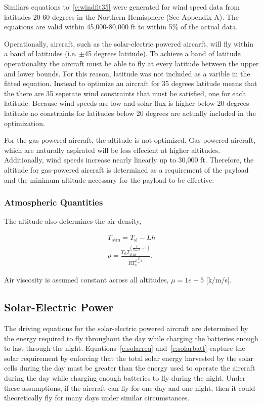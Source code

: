 \documentclass[]{aiaa-tc}%
\begin{document}
Similars equations to~\eqref{e:windfit35} were generated for wind speed data from latitudes 20-60 degrees in the Northern Hemisphere (See Appendix A).  The equations are valid within 45,000-80,000 ft to within 5\% of the actual data. 

Operationally, aircraft, such as the solar-electric powered aircarft, will fly within a band of latitudes (i.e. $\pm$45 degrees latitude).  
To achieve a band of latitude operationality the aircraft must be able to fly at every latitude between the upper and lower bounds.  
For this reason, latitude was not included as a varible in the fitted equation.  
Instead to optimize an aircraft for 35 degrees latitude means that the there are 35 seperate wind constraints that must be satisfied, one for each latitude.
Because wind speeds are low and solar flux is higher below 20 degrees latitude no constraints for latitudes below 20 degrees are actually included in the optimization. 

For the gas powered aircraft, the altitude is not optimized.  
Gas-powered aircraft, which are naturally aspirated will be less effecient at higher altitudes.  
Additionally, wind speeds increase nearly linearly up to 30,000 ft.  
Therefore, the altitude for gas-powered aircraft is determined as a requirement of the payload and the minimum altitude necessary for the payload to be effective. 

\subsubsection{Atmospheric Quantities}

The altitude also determines the air density,\cite{density}

\begin{align}
    \label{e:Talt}
    T_{\text{atm}} = T_{\text{sl}} - Lh \\
    \label{e:rhot}
    \rho = \frac{T_{\text{sl}}T_{\text{atm}}^{\left( \frac{g}{R_{\text{spec}}L} -1 \right)}}{R T_{\text{sl}}^{\frac{g}{R_{\text{spec}}L}}}.
\end{align}

Air viscosity is assumed constant across all altitudes, $\mu=1e-5$ [k/m/s].

\subsection{Solar-Electric Power}

The driving equations for the solar-electric powered aircraft are determined by the energy required to fly throughout the day while charging the batteries enough to last through the night.  
Equations~\ref{e:solarreq} and~\ref{e:solarbatt} capture the solar requirement by enforcing that the total solar energy harvested by the solar cells during the day must be greater than the energy used to operate the aircraft during the day while charging enough batteries to fly during the night. 
Under these assumptions, if the aircraft can fly for one day and one night, then it could theoretically fly for many days under similar circumstances. 
\end{document}
